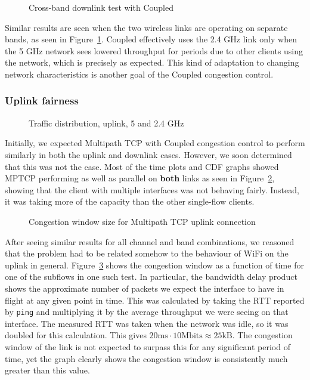 \begin{figure}[h]
 \centering
 
 \caption{Cross-band downlink test with Coupled}\label{graph:cb-fairness-down}
\end{figure}

Similar results are seen when the two wireless links are operating on separate
bands, as seen in Figure~\ref{graph:cb-fairness-down}. Coupled effectively uses
the 2.4 GHz link only when the 5 GHz network sees lowered throughput for periods
due to other clients using the network, which is precisely as expected. This
kind of adaptation to changing network characteristics is another goal of the
Coupled congestion control.

\subsubsection{Uplink fairness}

\begin{figure}[h]
 \centering
 
 \caption{Traffic distribution, uplink, 5 and 2.4 GHz}\label{graph:up-fair}
\end{figure}

Initially, we expected Multipath TCP with Coupled congestion control to perform
similarly in both the uplink and downlink cases. However, we soon determined
that this was not the case. Most of the time plots and CDF graphs showed MPTCP
performing as well as parallel on \textbf{both} links as seen in
Figure~\ref{graph:up-fair}, showing that the client with multiple interfaces was
not behaving fairly. Instead, it was taking more of the capacity than the other
single-flow clients.

\begin{figure}[h]
 \centering
 
 \caption{Congestion window size for Multipath TCP uplink connection}\label{graph:fairness-up-close}
\end{figure}

After seeing similar results for all channel and band combinations, we reasoned
that the problem had to be related somehow to the behaviour of WiFi on the
uplink in general. Figure~\ref{graph:fairness-up-close} shows the congestion
window as a function of time for one of the subflows in one such test. In
particular, the bandwidth delay product shows the approximate number of packets
we expect the interface to have in flight at any given point in time. This was
calculated by taking the RTT reported by \texttt{ping} and multiplying it by the
average throughput we were seeing on that interface. The measured RTT was taken
when the network was idle, so it was doubled for this calculation. This gives
$20\text{ms} \cdot 10\text{Mbits} \approx 25\text{kB}$. The congestion window of
the link is not expected to surpass this for any significant period of time, yet
the graph clearly shows the congestion window is consistently much greater than
this value.

